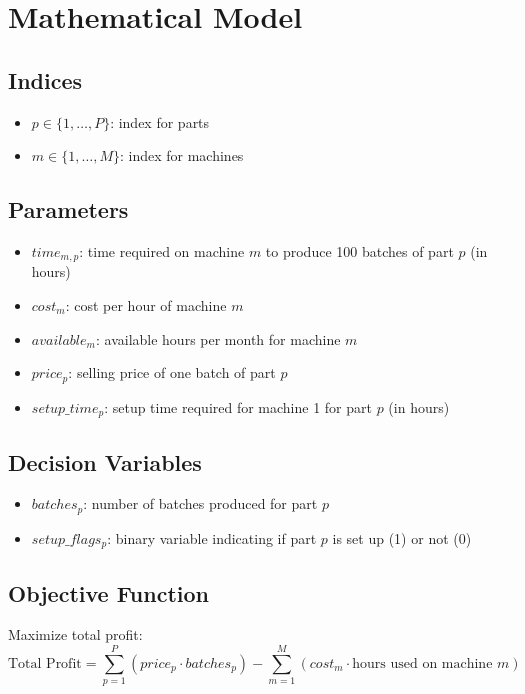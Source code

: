 \documentclass{article}
\begin{document}
\section*{Mathematical Model}

\subsection*{Indices}
\begin{itemize}
    \item $p \in \{1, \ldots, P\}$: index for parts
    \item $m \in \{1, \ldots, M\}$: index for machines
\end{itemize}

\subsection*{Parameters}
\begin{itemize}
    \item $time_{m,p}$: time required on machine $m$ to produce 100 batches of part $p$ (in hours)
    \item $cost_{m}$: cost per hour of machine $m$
    \item $available_{m}$: available hours per month for machine $m$
    \item $price_{p}$: selling price of one batch of part $p$
    \item $setup\_time_{p}$: setup time required for machine 1 for part $p$ (in hours)
\end{itemize}

\subsection*{Decision Variables}
\begin{itemize}
    \item $batches_{p}$: number of batches produced for part $p$
    \item $setup\_flags_{p}$: binary variable indicating if part $p$ is set up (1) or not (0)
\end{itemize}

\subsection*{Objective Function}
Maximize total profit:
\[
\text{Total Profit} = \sum_{p=1}^{P} (price_{p} \cdot batches_{p}) - \sum_{m=1}^{M} (cost_{m} \cdot \text{hours used on machine } m)
\]
\end{document}
